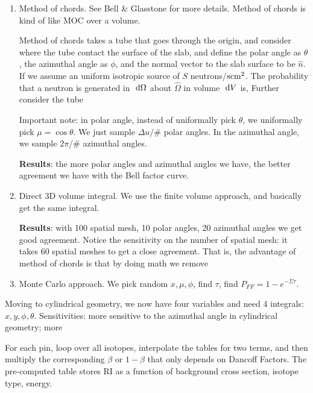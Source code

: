 \documentclass{school-22.211-notes}
\begin{document}
\begin{enumerate}
\item Method of chords. See Bell \& Glasstone for more details. Method of chords is kind of like MOC over a volume. 

Method of chords takes a tube that goes through the origin, and consider where the tube contact the surface of the slab, and define the polar angle as $\theta$, the azimuthal angle as $\phi$, and the normal vector to the slab surface to be $\hat{n}$. If we assume an uniform isotropic source of $S$ neutrons/$\mathrm{s}\mathrm{cm}^2$. The probability that a neutron is generated in $\mbox{ }\mathrm{d} \Omega$ about $\hat{\Omega}$ in volume $\mbox{ }\mathrm{d} V$ is, 
Further consider the tube 


Important note: in polar angle, instead of uniformally pick $\theta$, we uniformally pick $\mu = \cos \theta$. We just sample $\Delta u /$\# polar angles. In the azimuthal angle, we sample $2\pi$/\# azimuthal angles. 


\textbf{Results}: the more polar angles and azimuthal angles we have, the better agreement we have with the Bell factor curve. 


\item Direct 3D volume integral. We use the finite volume approach, and basically get the same integral. 

\textbf{Results}: with 100 spatial mesh, 10 polar angles, 20 azimuthal angles we get good agreement. Notice the sensitivity on the number of spatial mesh: it takes 60 spatial meshes to get a close agreement. That is, the advantage of method of chords is that by doing math we remove 


\item Monte Carlo approach. We pick random $x, \mu, \phi$, find $\tau$, find $P_{FF} = 1 - e^{-\Sigma \tau}$. 
\end{enumerate}


Moving to cylindrical geometry, we now have four variables and need 4 integrals: $x,y, \phi, \theta$. Sensitivities: more sensitive to the azimuthal angle in cylindrical geometry; more 


For each pin, loop over all isotopes, interpolate the tables for two terms, and then multiply the corresponding $\beta$ or $1-\beta$ that only depends on Dancoff Factors. The pre-computed table stores RI as a function of background cross section, isotope type, energy. 
\end{document}
